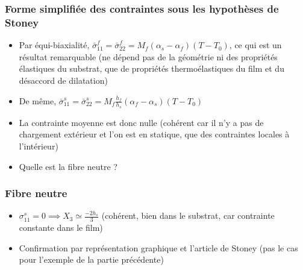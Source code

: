 
\begin{frame}
    \frametitle{Forme simplifiée des contraintes sous les hypothèses de Stoney}
    \begin{itemize}
        \item Par équi-biaxialité, $\bar{\sigma}_{11}^f=\bar{\sigma}_{22}^f=M_f(\alpha_s-\alpha_f)(T-T_0)$, ce qui est un résultat remarquable (ne dépend pas de la géométrie ni des propriétés élastiques du substrat, que de propriétés thermoélastiques du film et du désaccord de dilatation)
        \item De même, $\bar{\sigma}_{11}^s=\bar{\sigma}_{22}^s=M_f\frac{h_f}{h_s}(\alpha_f-\alpha_s)(T-T_0)$
        \item La contrainte moyenne est donc nulle (cohérent car il n'y a pas de chargement extérieur et l'on est en statique, que des contraintes locales à l'intérieur)
        \item Quelle est la fibre neutre ?
    \end{itemize}
\end{frame}


\begin{frame}
    \frametitle{Fibre neutre}
    \begin{itemize}
        \item $\sigma_{11}^s=0 \implies X_3 \simeq \frac{-2h_s}{3}$ (cohérent, bien dans le substrat, car contrainte constante dans le film)
        \item Confirmation par représentation graphique et l'article de Stoney (pas le cas pour l'exemple de la partie précédente)
    \end{itemize}
\end{frame}

